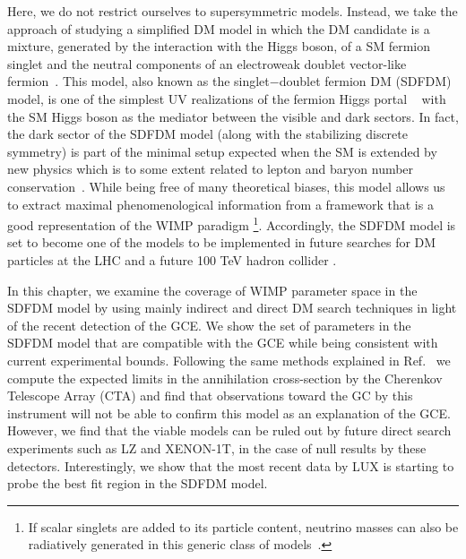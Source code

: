 
Here, we do not restrict ourselves to supersymmetric models. Instead, we take the approach of studying a simplified DM model in which the DM candidate is a mixture, generated by the interaction with the Higgs boson, of a SM fermion singlet and the neutral components of an electroweak doublet vector-like fermion~\cite{ArkaniHamed:2005yv,Mahbubani:2005pt,D'Eramo:2007ga,Enberg:2007rp}. This model, also known as the singlet$-$doublet fermion DM (SDFDM) model, is one of the simplest UV realizations of the fermion Higgs portal ~\cite{Patt:2006fw} with the SM Higgs boson as the mediator between the visible and dark sectors. In fact, the dark sector of the SDFDM model (along with the stabilizing discrete symmetry) is part of the minimal setup expected when the SM is extended by new physics which is to some extent related to lepton and baryon number conservation~\cite{Arbelaez:2015ila,Arkani-Hamed:2015vfh}. While being free of many theoretical biases, this  model allows us to extract maximal phenomenological information from a framework that is a good representation of the WIMP paradigm \cite{ArkaniHamed:2005yv,Mahbubani:2005pt,D'Eramo:2007ga,Enberg:2007rp,Cohen:2011ec,Cheung:2013dua,Abe:2014gua,Calibbi:2015nha,Freitas:2015hsa,Abdallah:2015ter}\footnote{ If scalar singlets are added to its particle content, neutrino masses can also be radiatively generated in this generic class of models~\cite{Restrepo:2015ura}.}.     
Accordingly, the SDFDM model is set to become one of the models to be implemented in future searches for DM particles at the LHC \cite{Abdallah:2015ter} and a future 100 TeV hadron collider \cite{Gori:2014oua,Arkani-Hamed:2015vfh}.  


In this chapter, we examine the coverage of WIMP parameter space in the SDFDM model by using mainly indirect and direct DM search techniques in light of the recent detection of the GCE. We show the set of parameters in the SDFDM model that are compatible with the GCE while being consistent with current experimental bounds. Following the same methods explained in Ref.~\cite{Silverwood:2014yza} we compute the expected limits in the annihilation cross-section by the Cherenkov Telescope Array (CTA) and find that observations toward the GC by this instrument will not be able to confirm this model as an explanation of the GCE. However, we find that the viable models can be ruled out by future
direct search experiments such as LZ and XENON-1T, in the case of null results by these detectors. Interestingly, we show that the most recent data by LUX is starting to probe the best fit region in the SDFDM model.

